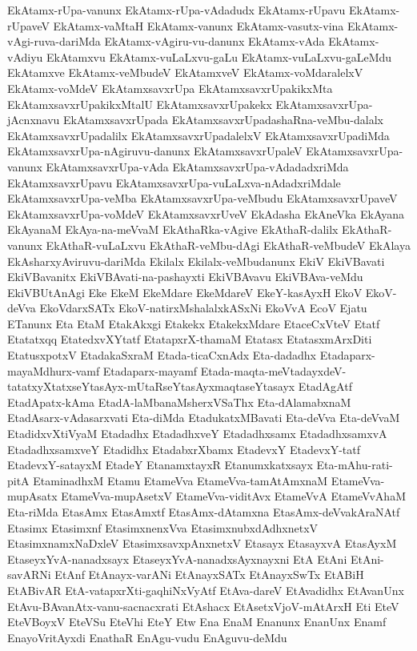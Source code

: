 {EkAtamx-rUpa-vanunx
EkAtamx-rUpa-vAdadudx
EkAtamx-rUpavu
EkAtamx-rUpaveV
EkAtamx-vaMtaH
EkAtamx-vanunx
EkAtamx-vasutx-vina
EkAtamx-vAgi-ruva-dariMda
EkAtamx-vAgiru-vu-danunx
EkAtamx-vAda
EkAtamx-vAdiyu
EkAtamxvu
EkAtamx-vuLaLxvu-gaLu
EkAtamx-vuLaLxvu-gaLeMdu
EkAtamxve
EkAtamx-veMbudeV
EkAtamxveV
EkAtamx-voMdaralelxV
EkAtamx-voMdeV
EkAtamxsavxrUpa
EkAtamxsavxrUpakikxMta
EkAtamxsavxrUpakikxMtalU
EkAtamxsavxrUpakekx
EkAtamxsavxrUpa-jAcnxnavu
EkAtamxsavxrUpada
EkAtamxsavxrUpadashaRna-veMbu-dalalx
EkAtamxsavxrUpadalilx
EkAtamxsavxrUpadalelxV
EkAtamxsavxrUpadiMda
EkAtamxsavxrUpa-nAgiruvu-danunx
EkAtamxsavxrUpaleV
EkAtamxsavxrUpa-vanunx
EkAtamxsavxrUpa-vAda
EkAtamxsavxrUpa-vAdadadxriMda
EkAtamxsavxrUpavu
EkAtamxsavxrUpa-vuLaLxva-nAdadxriMdale
EkAtamxsavxrUpa-veMba
EkAtamxsavxrUpa-veMbudu
EkAtamxsavxrUpaveV
EkAtamxsavxrUpa-voMdeV
EkAtamxsavxrUveV
EkAdasha
EkAneVka
EkAyana
EkAyanaM
EkAya-na-meVvaM
EkAthaRka-vAgive
EkAthaR-dalilx
EkAthaR-vanunx
EkAthaR-vuLaLxvu
EkAthaR-veMbu-dAgi
EkAthaR-veMbudeV
EkAlaya
EkAsharxyAviruvu-dariMda
Ekilalx
Ekilalx-veMbudanunx
EkiV
EkiVBavati
EkiVBavanitx
EkiVBAvati-na-pashayxti
EkiVBAvavu
EkiVBAva-veMdu
EkiVBUtAnAgi
Eke
EkeM
EkeMdare
EkeMdareV
EkeY-kasAyxH
EkoV
EkoV-deVva
EkoVdarxSATx
EkoV-natirxMshalalxkASxNi
EkoVvA
EcoV
Ejatu
ETanunx
Eta
EtaM
EtakAkxgi
Etakekx
EtakekxMdare
EtaceCxVteV
Etatf
Etatatxqq
EtatedxvXYtatf
EtatapxrX-thamaM
Etatasx
EtatasxmArxDiti
EtatusxpotxV
EtadakaSxraM
Etada-ticaCxnAdx
Eta-dadadhx
Etadaparx-mayaMdhurx-vamf
Etadaparx-mayamf
Etada-maqta-meVtadayxdeV-tatatxyXtatxseYtasAyx-mUtaRseYtasAyxmaqtaseYtasayx
EtadAgAtf
EtadApatx-kAma
EtadA-laMbanaMsherxVSaThx
Eta-dAlamabxnaM
EtadAsarx-vAdasarxvati
Eta-diMda
EtadukatxMBavati
Eta-deVva
Eta-deVvaM
EtadidxvXtiVyaM
Etadadhx
EtadadhxveY
Etadadhxsamx
EtadadhxsamxvA
EtadadhxsamxveY
Etadidhx
EtadabxrXbamx
EtadevxY
EtadevxY-tatf
EtadevxY-satayxM
EtadeY
EtanamxtayxR
Etanumxkatxsayx
Eta-mAhu-rati-pitA
EtaminadhxM
Etamu
EtameVva
EtameVva-tamAtAmxnaM
EtameVva-mupAsatx
EtameVva-mupAsetxV
EtameVva-viditAvx
EtameVvA
EtameVvAhaM
Eta-riMda
EtasAmx
EtasAmxtf
EtasAmx-dAtamxna
EtasAmx-deVvakAraNAtf
Etasimx
Etasimxnf
EtasimxnenxVva
EtasimxnubxdAdhxnetxV
EtasimxnamxNaDxleV
EtasimxsavxpAnxnetxV
Etasayx
EtasayxvA
EtasAyxM
EtaseyxYvA-nanadxsayx
EtaseyxYvA-nanadxsAyxnayxni
EtA
EtAni
EtAni-savARNi
EtAnf
EtAnayx-varANi
EtAnayxSATx
EtAnayxSwTx
EtABiH
EtABivAR
EtA-vatapxrXti-gaqhiNxVyAtf
EtAva-dareV
EtAvadidhx
EtAvanUnx
EtAvu-BAvanAtx-vanu-sacnacxrati
EtAshacx
EtAsetxVjoV-mAtArxH
Eti
EteV
EteVBoyxV
EteVSu
EteVhi
EteY
Etw
Ena
EnaM
Enanunx
EnanUnx
Enamf
EnayoVritAyxdi
EnathaR
EnAgu-vudu
EnAguvu-deMdu
}
